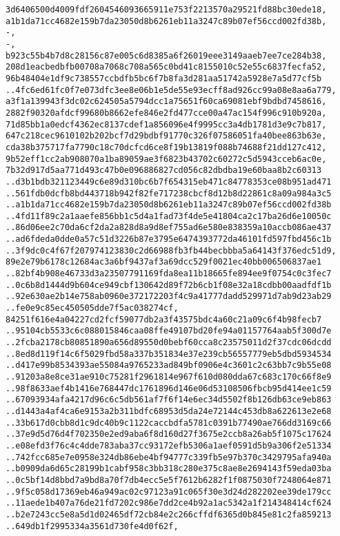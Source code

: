 \documentclass[
]{article}
\begin{document}
\begin{verbatim}
3d6406500d4009fdf2604546093665911e753f2213570a29521fd88bc30ede18,
a1b1da71cc4682e159b7da23050d8b6261eb11a3247c89b07ef56ccd002fd38b,
-,
-,
b923c55b4b7d8c28156c87e005c6d8385a6f26019eee3149aaeb7ee7ce284b38,
208d1eacbedbfb00708a7068c708a565c0bd41c8155010c52e55c6837fecfa52,
96b48404e1df9c738557ccbdfb5bc6f7b8fa3d281aa51742a5928e7a5d77cf5b
..4fc6ed61fc0f7e073dfc3ee8e06b1e5de55e93ecff8ad926cc99a08e8aa6a779,
a3f1a139943f3dc02c624505a5794dcc1a75651f60ca69081ebf9bdbd7458616,
2882f90320afdcf99680b8662efe846e2fd477cce00a47ac154f996c910b920a,
71d85bb1a0edcf4362ec8137cdef1a856096e4f9995cc3a4db1781d3e9c7b817,
647c218cec9610102b202bcf7d29bdbf91770c326f07586051fa40bee863b63e,
cda38b375717fa7790c18c70dcfcd6ce8f19b13819f088b74688f21dd127c412,
9b52eff1cc2ab908070a1ba89059ae3f6823b43702c60272c5d5943cceb6ac0e,
7b32d917d5aa771d493c47b0e096886827cd056c82dbdba19e60baa8b2c60313
..d3b1bdb321123449c6e89d310bc6b7f654315eb471c84778353ce08b951ad471
..561fdb0dcfb8bd443718b942f82fe717238cbcf8d12b8d22861c8a09a984a3c5
..a1b1da71cc4682e159b7da23050d8b6261eb11a3247c89b07ef56ccd002fd38b
..4fd11f89c2a1aaefe856bb1c5d4a1fad73f4de5e41804ca2c17ba26d6e10050c
..86d06ee2c70da6cf2da2a828d8a9d8ef755ad6e580e838359a10accb086ae437
..ad6fdeda0dde0a57c51d3226b87e3795e6474393772da46101fd597fbd456c1b
..3f9dc0c4f67f207974123830c2d66988fb3fb44becbbba5a64143f376edc51d9,
89e2e79b6178c12684ac3a6bf9437af3a69dcc529f0021ec40bb006506837ae1
..82bf4b908e46733d3a23507791169fda8ea11b18665fe894ee9f0754c0c3fec7
..0c6b8d1444d9b604ce949cbf130642d89f72b6cb1f08e32a18cdbb00aadfdf1b
..92e630ae2b14e758ab0960e372172203f4c9a41777dadd529971d7ab9d23ab29
..fe0e9c85ec450505dde7f5ac038274cf,
84251f616e4a04227cd2fcf59077db2a3f43575bdc4a60c21a09c6f4b98fecb7
..95104cb5533c6c088015846caa08ffe49107bd20fe94a01157764aab5f300d7e
..2fcba2178cb80851890a656d89550d0bebf60cca8c23575011d2f37cdc06dcdd
..8ed8d119f14c6f5029fbd58a337b351834e37e239cb56557779eb5dbd5934534
..d417e99b8534393ae55084a9765233ad849bf0906e4c3601c2c63bb7c9b55e08
..91203a8e8ce31ae910c75281f2961814e967f610d080dda67c683c170c66f8e9
..98f8633aef4b1416e768447dc1761896d146e06d53108506fbcb95d414ee1c59
..67093934afa4217d96c6c5db561af7f6f14e6ec34d5502f8b126db63ce9eb863
..d1443a4af4ca6e9153a2b311bdfc68953d5da24e72144c453db8a622613e2e68
..33b617d0cbb8d1c9dc40b9c1122caccbdfa5781c0391b77490ae766dd3169c66
..37e9d5d76d4f702350e2ed9aba6f8d160d27f3675e2ccb8a26ab5f1075c17624
..e08efd3f76c4c4dde783aba37cc93172efb5306a1aef0591d5b9a306f2e51334
..742fcc685e7e0958e324db86ebe4bf94777c339fb5e97b370c3429795afa940a
..b0909da6d65c28199b1cabf958c3bb318c280e375c8ae8e2694143f59eda03ba
..0c5bf14d8bbd7a9bd8a70f7db4ecc5e5f7612b6282f1f0875030f7248064e871
..9f5c058d17369eb46a949ac02c97123a91c065f30e3d24d282202ee39de179cc
..11aede1b407a76de21fd7202c986e7dd2ce4b92a1ac5342a1f214348414cf624
..b2e7243cc5e8a5d1d02465df72cb84e2c266cffdf6365d0b845e81c2fa859213
..649db1f2995334a3561d730fe4d0f62f,
\end{verbatim}
\end{document}
